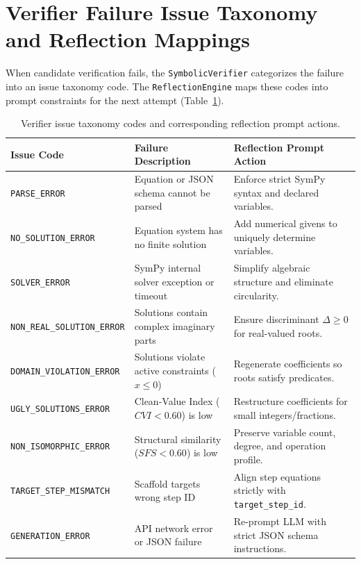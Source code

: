 \documentclass[11pt,letterpaper]{article}
\begin{document}
\section{Verifier Failure Issue Taxonomy and Reflection Mappings}\label{sec:issue-taxonomy}

When candidate verification fails, the \texttt{SymbolicVerifier} categorizes the failure into an issue taxonomy code. The \texttt{ReflectionEngine} maps these codes into prompt constraints for the next attempt (Table~\ref{tab:issue-taxonomy}).

\begin{table}[htbp]
\centering
\small
\caption{Verifier issue taxonomy codes and corresponding reflection prompt actions.}
\label{tab:issue-taxonomy}
\begin{tabular}{lll}
\toprule
Issue Code & Failure Description & Reflection Prompt Action \\
\midrule
\texttt{PARSE\_ERROR} & Equation or JSON schema cannot be parsed & Enforce strict SymPy syntax and declared variables. \\
\texttt{NO\_SOLUTION\_ERROR} & Equation system has no finite solution & Add numerical givens to uniquely determine variables. \\
\texttt{SOLVER\_ERROR} & SymPy internal solver exception or timeout & Simplify algebraic structure and eliminate circularity. \\
\texttt{NON\_REAL\_SOLUTION\_ERROR} & Solutions contain complex imaginary parts & Ensure discriminant $\Delta \ge 0$ for real-valued roots. \\
\texttt{DOMAIN\_VIOLATION\_ERROR} & Solutions violate active constraints ($x \le 0$) & Regenerate coefficients so roots satisfy predicates. \\
\texttt{UGLY\_SOLUTIONS\_ERROR} & Clean-Value Index ($CVI < 0.60$) is low & Restructure coefficients for small integers/fractions. \\
\texttt{NON\_ISOMORPHIC\_ERROR} & Structural similarity ($SFS < 0.60$) is low & Preserve variable count, degree, and operation profile. \\
\texttt{TARGET\_STEP\_MISMATCH} & Scaffold targets wrong step ID & Align step equations strictly with \texttt{target\_step\_id}. \\
\texttt{GENERATION\_ERROR} & API network error or JSON failure & Re-prompt LLM with strict JSON schema instructions. \\
\bottomrule
\end{tabular}
\end{table}
\end{document}
